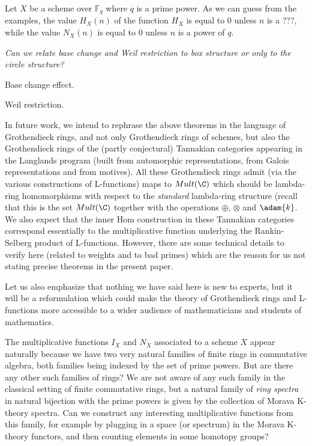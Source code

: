 \documentclass[a4paper]{article}
\begin{document}
\begin{remark}
Let $X$ be a scheme over $\mathbb{F}_q$ where $q$ is a prime power. As we can guess from the examples, the value $H_X(n)$ of the function $H_X$ is equal to 0 unless $n$ is a ???, while the value $N_X(n)$ is equal to 0 unless $n$ is a power of $q$.
\end{remark}

\emph{Can we relate base change and Weil restriction to box structure or only to the circle structure?}

\begin{theorem}

Base change effect.
\end{theorem}


\begin{theorem}

Weil restriction.
\end{theorem}



In future work, we intend to rephrase the above theorems in the language of Grothendieck rings, and not only Grothendieck rings of schemes, but also the Grothendieck rings of the (partly conjectural) Tannakian categories appearing in the Langlands program (built from automorphic representations, from Galois representations and from motives). All these Grothendieck rings admit (via the various constructions of L-functions) maps to $Mult(\C)$ which should be lambda-ring homomorphisms with respect to the \emph{standard} lambda-ring structure (recall that this is the set $Mult(\C)$ together with the operations $\oplus$, $\otimes$ and $\adam{k}$. We also expect that the inner Hom construction in these Tannakian categories correspond essentially to the multiplicative function underlying the Rankin-Selberg product of L-functions. However, there are some technical details to verify here (related to weights and to bad primes) which are the reason for us not stating precise theorems in the present paper. 

Let us also emphasize that nothing we have said here is new to experts, but it will be a reformulation which could make the theory of Grothendieck rings and L-functions more accessible to a wider audience of mathematicians and students of mathematics. 



\begin{remark}
The multiplicative functions $I_X$ and $N_X$ associated to a scheme $X$ appear naturally because we have two very natural families of finite rings in commutative algebra, both families being indexed by the set of prime powers. But are there any other such families of rings? We are not aware of any such family in the classical setting of finite commutative rings, but a natural family of \emph{ring spectra} in natural bijection with the prime powers is given by the collection of Morava K-theory spectra. Can we construct any interesting multiplicative functions from this family, for example by plugging in a space (or spectrum) in the Morava K-theory functors, and then counting elements in some homotopy groups? 
\end{remark}
\end{document}
